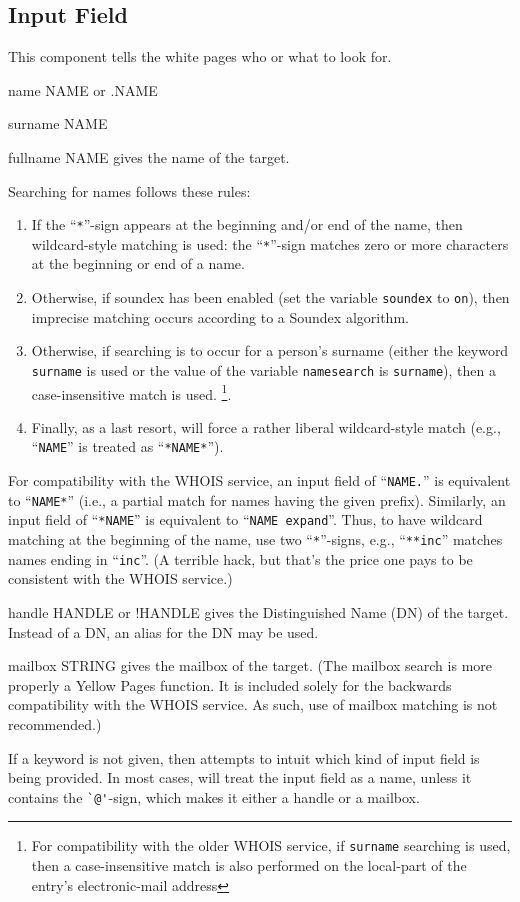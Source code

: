 \subsection	{Input Field}
This component tells the white pages who or what to look for.
\begin{describe}
\item[name NAME {\rm or} .NAME]
\item[surname NAME]
\item[fullname NAME]
gives the name of the target.

Searching for names follows these rules:
\begin{enumerate}
\item	If the ``\verb"*"''-sign appears at the beginning and/or end of the
name, 
then wildcard-style matching is used:
the ``\verb"*"''-sign matches zero or more characters at the beginning
or end of a name.

\item	Otherwise,
if soundex has been enabled (set the variable \verb"soundex" to \verb"on"),
then imprecise matching occurs according to a Soundex algorithm.

\item	Otherwise,
if searching is to occur for a person's surname
(either the keyword \verb"surname" is used
or the value of the variable \verb"namesearch" is \verb"surname"),
then a case-insensitive match is used.%
\footnote{For compatibility with the older WHOIS service,
if \verb"surname" searching is used,
then a case-insensitive match is also performed on the local-part of the
entry's electronic-mail address}.

\item	Finally,
as a last resort,
 will force a rather liberal wildcard-style match
(e.g., ``\verb"NAME"'' is treated as ``\verb"*NAME*"'').
\end{enumerate}
For compatibility with the WHOIS service,
an input field of ``\verb"NAME."'' is equivalent to ``\verb"NAME*"''
(i.e., a partial match for names having the given prefix).
Similarly,
an input field of ``\verb"*NAME"'' is equivalent to ``\verb"NAME expand"''.
Thus, to have wildcard matching at the beginning of the name,
use two ``\verb"*"''-signs,
e.g., ``\verb"**inc"'' matches names ending in ``\verb"inc"''.
(A terrible hack, but that's the price one pays to be consistent with the
WHOIS service.)

\item[handle HANDLE {\rm or} !HANDLE]
gives the Distinguished Name (DN) of the target.
Instead of a DN,
an alias for the DN may be used.

\item[mailbox STRING] gives the mailbox of the target.
(The mailbox search is more properly a Yellow Pages function.
It is included solely for the backwards compatibility with the WHOIS service.
As such,
use of mailbox matching is not recommended.)
\end{describe}
If a keyword is not given,
then  attempts to intuit which kind of input field is being provided.
In most cases,
 will treat the input field as a name,
unless it contains the \verb"`@'"-sign,
which makes it either a handle or a mailbox.

